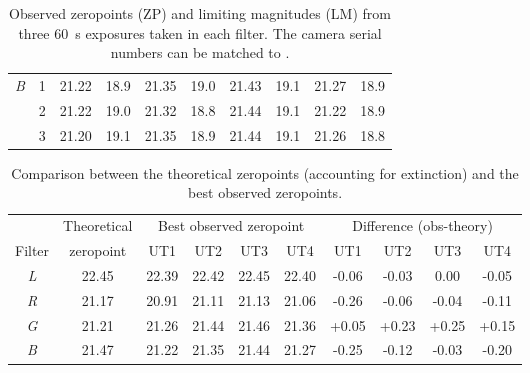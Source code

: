 \begin{colsection}
\begin{table}[p]
\begin{center}
\begin{tabular}{cc|cc|cc|cc|cc}
            \textit{B} & 1 &
            21.22 & 18.9 &
            21.35 & 19.0 &
            21.43 & 19.1 &
            21.27 & 18.9
            \\
            & 2 &
            21.22 & 19.0 &
            21.32 & 18.8 &
            21.44 & 19.1 &
            21.22 & 18.9
            \\
            & 3 &
            21.20 & 19.1 &
            21.35 & 18.9 &
            21.44 & 19.1 &
            21.26 & 18.8
            \\
        \end{tabular}
    \end{center}
    \caption[Observed zeropoints and limiting magnitudes]{
        Observed zeropoints (ZP)  and limiting magnitudes (LM)  from three \SI{60}{\second} exposures taken in each filter. The camera serial numbers can be matched to .
    }\label{tab:zps_lms}
\end{table}

\begin{table}[p]
    \begin{center}
        \begin{tabular}{c|c|cccc|cccc} %
             &
            Theoretical &
            \multicolumn{4}{c|}{Best observed zeropoint} &
            \multicolumn{4}{c}{Difference (obs-theory)}
            \\
            Filter & zeropoint & UT1 & UT2 & UT3 & UT4 & UT1 & UT2 & UT3 & UT4 \\
            \midrule
            \textit{L} & 22.45 & 22.39 & 22.42 & 22.45 & 22.40 & -0.06 & -0.03 &  0.00 & -0.05 \\
            \textit{R} & 21.17 & 20.91 & 21.11 & 21.13 & 21.06 & -0.26 & -0.06 & -0.04 & -0.11 \\
            \textit{G} & 21.21 & 21.26 & 21.44 & 21.46 & 21.36 & +0.05 & +0.23 & +0.25 & +0.15 \\
            \textit{B} & 21.47 & 21.22 & 21.35 & 21.44 & 21.27 & -0.25 & -0.12 & -0.03 & -0.20 \\
        \end{tabular}
    \end{center}
    \caption[Comparison between theoretical and observed zeropoints]{
        Comparison between the theoretical zeropoints (accounting for extinction) and the best observed zeropoints.
    }\label{tab:zps_comparison}
\end{table}


\end{colsection}
